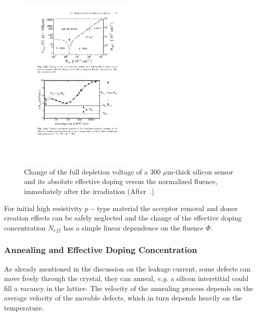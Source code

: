  \begin{figure}[htpb]
 \centering
 \includegraphics[width=0.5\textwidth]{typeinversion.pdf}
 \caption{\label{fig:typeinversion} Change of the full depletion voltage of a 300 $\mu$m-thick silicon 
 sensor and its absolute effective doping versus the normalized fluence, immediately after the irradiation (After~\cite{wunstors-thesis}.)}
 \end{figure}

For initial high resistivity $p-$type material the acceptor removal and donor creation effects can be 
safely neglected and the change of the effective doping concentration $N_{eff}$ has a simple linear 
dependence on the fluence $\Phi$.





\subsubsection{Annealing and Effective Doping Concentration}

 
As already mentioned in the discussion on the leakage current,  some defects can move freely 
through the crystal, they can anneal, {\it e.g.} a silicon interstitial 
could fill a vacancy in the lattice. The velocity of the annealing process depends on the average 
velocity of the movable defects, which in turn depends heavily on the temperature.


